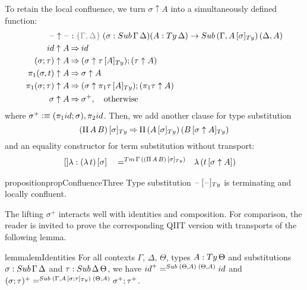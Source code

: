 \documentclass[a4paper,UKenglish,numberwithinsect,cleveref,thm-restate]{lipics-v2021}
\newcommand{\danger}{\marginpar[\hfill\dbend]{\dbend\hfill}}
\begin{document}
To retain the local confluence, we turn $\sigma \uparrow A$ into a simultaneously defined function:
\begin{alignat}{3}
  \blank\uparrow \blank & : \implicit{\Gamma, \Delta}\; (\sigma : \Sub\,\Gamma\,\Delta) (A : \Ty\,\Delta) \to \Sub\,(\Gamma, \subTy{A}{\sigma})\, (\Delta, A) \label{eq:type-of-lifting} \\
\idS                \uparrow A & \reduce \idS \nonumber \\
(\sigma ; \tau)     \uparrow A & \reduce (\sigma \uparrow \subTy{\tau}{A} ) ; (\tau \uparrow A) \nonumber \\
\pi_1(\sigma, t)    \uparrow A & \reduce \sigma \uparrow A \nonumber \\
\pi_1(\sigma; \tau) \uparrow A & \reduce (\sigma \uparrow \subTy{\pi_1 \tau}{A}) ; (\pi_1 \tau \uparrow A)\nonumber \\
\sigma              \uparrow A & \reduce \sigma^+ , \quad \text{otherwise} \nonumber
\end{alignat}
where $\sigma^+ \defeq (\pi_1\idS ; \sigma), \pi_2\idS$.
Then, we add another clause for type substitution
\begin{equation*}
  \subTy{(\Pi\,A\,B)}{\sigma} \reduce \Pi\,(\subTy{A}{\sigma})\,(\subTy{B}{\sigma\uparrow A}) %
\end{equation*}
and an equality constructor for term substitution without transport:
\begin{alignat}{5}
  \mathsf{[]\lambda} :{} & \sub{(\lambda\,t)}{\sigma} && =^{\Tm\,\Gamma\,(\subTy{(\Pi\,A\,B)}{\sigma})} && \lambda\,(\sub{t}{\sigma \uparrow A}) \nonumber
\end{alignat}

\begin{restatable}{proposition}{propConfluenceThree}\label{prop:local-confluence-3}
  Type substitution $\subTy{\blank}{\blank}$ is terminating and locally confluent.
    \danger
\end{restatable}

The lifting $\sigma^+$ interacts well with identities and composition.
For comparison, the reader is invited to prove the corresponding QIIT version with transports of the following lemma.
%
\begin{restatable}{lemma}{lemIdentities}\label{lem:lifting}
  For all contexts $\Gamma$, $\Delta$, $\Theta$, types $A : \Ty\,\Theta$ and substitutions $\sigma : \Sub\,\Gamma\,\Delta$ and $\tau : \Sub\,\Delta\,\Theta$, we have $\idS^+ =^{\Sub\;(\Theta, A)\;(\Theta, A)} \idS$ and $(\sigma; \tau)^+     =^{\Sub\;(\Gamma, \subTy{A}{\sigma; \tau})\;(\Theta, A)} \sigma^+ ; \tau^+$.
\end{restatable}
\end{document}
